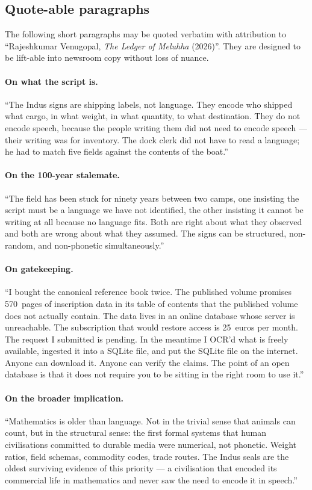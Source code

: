 \subsection{Quote-able paragraphs}

The following short paragraphs may be quoted verbatim with
attribution to ``Rajeshkumar Venugopal, \textit{The Ledger of
Meluhha} (2026)''. They are designed to be lift-able into newsroom
copy without loss of nuance.

\paragraph{On what the script is.}
``The Indus signs are shipping labels, not language. They encode
who shipped what cargo, in what weight, in what quantity, to what
destination. They do not encode speech, because the people writing
them did not need to encode speech --- their writing was for
inventory. The dock clerk did not have to read a language; he had
to match five fields against the contents of the boat.''

\paragraph{On the 100-year stalemate.}
``The field has been stuck for ninety years between two camps,
one insisting the script must be a language we have not
identified, the other insisting it cannot be writing at all
because no language fits. Both are right about what they observed
and both are wrong about what they assumed. The signs can be
structured, non-random, and non-phonetic simultaneously.''

\paragraph{On gatekeeping.}
``I bought the canonical reference book twice. The published
volume promises 570~pages of inscription data in its table of
contents that the published volume does not actually contain. The
data lives in an online database whose server is unreachable. The
subscription that would restore access is 25~euros per month. The
request I submitted is pending. In the meantime I OCR'd what is
freely available, ingested it into a SQLite file, and put the
SQLite file on the internet. Anyone can download it. Anyone can
verify the claims. The point of an open database is that it does
not require you to be sitting in the right room to use it.''

\paragraph{On the broader implication.}
``Mathematics is older than language. Not in the trivial sense
that animals can count, but in the structural sense: the first
formal systems that human civilisations committed to durable media
were numerical, not phonetic. Weight ratios, field schemas,
commodity codes, trade routes. The Indus seals are the oldest
surviving evidence of this priority --- a civilisation that
encoded its commercial life in mathematics and never saw the need
to encode it in speech.''


